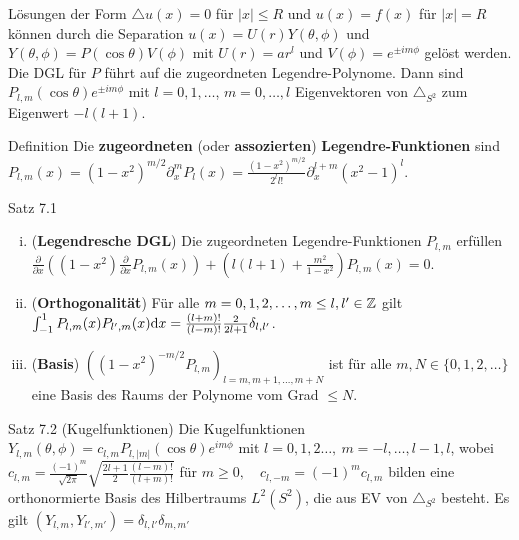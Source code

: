 Lösungen der Form $\triangle u(x)=0$ für $|x|\leq R$ und $u(x)=f(x)$ für $|x|=R$ können durch die Separation $u(x)=U(r)Y(\theta,\phi)$ und $Y(\theta,\phi)=P(\cos\theta)V(\phi)$ mit $U(r)=ar^l$ und $V(\phi)=e^{\pm im\phi}$ gelöst werden. Die DGL für $P$ führt auf die zugeordneten Legendre-Polynome. Dann sind $P_{l,m}(\cos\theta)e^{\pm im\phi}$ mit $l=0,1,\ldots$, $m=0,
\ldots,l$ Eigenvektoren von $\triangle_{S^2}$ zum Eigenwert $-l(l+1)$.

\begin{namedtheorem}{Definition}
  Die \textbf{zugeordneten} (oder \textbf{assozierten}) \textbf{Legendre-Funktionen} sind $P_{l,m}(x)=(1-x^2)^{m/2}\partial^m_xP_l(x)=\frac{(1-x^2)^{m/2}}{2^ll!}\partial^{l+m}_x(x^2-1)^l$.
\end{namedtheorem}

\begin{namedtheorem}{Satz 7.1}
  \begin{enumerate}[(i)]
    \item (\textbf{Legendresche DGL}) Die zugeordneten Legendre-Funktionen $P_{l,m}$ erfüllen $\frac{\partial}{\partial x}\left((1-x^2)\frac{\partial}{\partial x}P_{l,m}(x)\right) + \left(l(l+1) + \frac{m^2}{1-x^2}\right)P_{l,m}(x) = 0$.
    \item (\textbf{Orthogonalität}) Für alle $m=0,1,2,\ldots,m\leq l,l'\in\mathbb{Z}$ gilt $\int_{-1}^1P_{l,m}(x)P_{l',m}(x)\mathrm{d} x = \frac{(l+m)!}{(l-m)!}\frac2{2l+1}\delta_{l,l'}$.
    \item (\textbf{Basis}) $\left((1-x^2)^{-m/2}P_{l,m}\right)_{l=m,m+1,\ldots,m+N}$ ist für alle $m,N\in\{0,1,2,\ldots\}$ eine Basis des Raums der Polynome vom Grad $\leq N$.
  \end{enumerate}
\end{namedtheorem}

\begin{namedtheorem}{Satz 7.2 (Kugelfunktionen)}
  Die Kugelfunktionen $Y_{l,m}(\theta,\phi)=c_{l,m}P_{l,|m|}(\cos\theta)e^{im\phi}$ mit $l=0,1,2\ldots,\ m=-l,\ldots,l-1,l$, wobei $c_{l,m} = \frac{(-1)^m}{\sqrt{2\pi}} \sqrt{\frac{2l+1}2\frac{(l-m)!}{(l+m)!}} $ für $m\geq 0,\quad c_{l,-m}=(-1)^mc_{l,m}$ bilden eine orthonormierte Basis des Hilbertraums $L^2(S^2)$, die aus EV von $\triangle_{S^2}$ besteht. Es gilt $(Y_{l, m}, Y_{l', m'}) = \delta_{l, l'} \delta_{m, m'}$
\end{namedtheorem}

